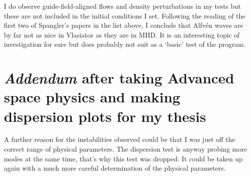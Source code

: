 \documentclass[a4paper,10pt]{scrartcl}
\begin{document}
I do observe guide-field-aligned flows and density perturbations in my tests but these are not included in the initial conditions I set. Following the reading of the first two of Spangler's papers in the list above, I conclude that Alfvén waves are by far not as nice in Vlasiator as they are in MHD. It is an interesting topic of investigation for sure but does probably not suit as a `basic' test of the program.

\section{\textit{Addendum} after taking Advanced space physics and making dispersion plots for my thesis}
A further reason for the instabilities observed could be that I was just off the correct range of physical parameters. The dispersion test is anyway probing more modes at the same time, that's why this test was dropped. It could be taken up again with a much more careful determination of the physical parameters.
\end{document}
